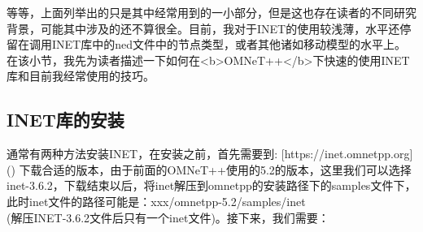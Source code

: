 等等，上面列举出的只是其中经常用到的一小部分，但是这也存在读者的不同研究背景，可能其中涉及的还不算很全。目前，我对于INET的使用较浅薄，水平还停留在调用INET库中的ned文件中的节点类型，或者其他诸如移动模型的水平上。在该小节，我先为读者描述一下如何在<b>OMNeT++</b>下快速的使用INET库和目前我经常使用的技巧。\\

\subsection{INET库的安装}
通常有两种方法安装INET，在安装之前，首先需要到:
[https://inet.omnetpp.org]()
下载合适的版本，由于前面的OMNeT++使用的5.2的版本，这里我们可以选择inet-3.6.2，下载结束以后，将inet解压到omnetpp的安装路径下的samples文件下，此时inet文件的路径可能是：xxx/omnetpp-5.2/samples/inet\\
(解压INET-3.6.2文件后只有一个inet文件)。接下来，我们需要：

